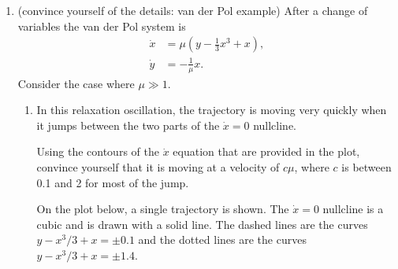 \documentclass[12pt]{amsart}
\theoremstyle{plain}
\theoremstyle{definition}
\theoremstyle{definition}
\theoremstyle{plain}
\begin{document}
    \begin{enumerate}
        \item (convince yourself of the details: van der Pol example) After a change of variables the van der Pol system is
        \[\begin{aligned}\dot x&=\mu\left(y-\frac13x^3+x\right),\\\dot y&=-\frac1\mu x.\end{aligned}\]
        Consider the case where $\mu\gg1$.
        \begin{enumerate}
            \item In this relaxation oscillation, the trajectory is moving very quickly when it jumps between the two parts of the $\dot x=0$ nullcline.

            Using the contours of the $\dot x$ equation that are provided in the plot, convince yourself that it is moving at a velocity of $c\mu$, where $c$ is between 0.1 and 2 for most of the jump.

            On the plot below, a single trajectory is shown. The $\dot x=0$ nullcline is a cubic and is drawn with a solid line. The dashed lines are the curves $y-x^3/3+x=\pm0.1$ and the dotted lines are the curves $y-x^3/3+x=\pm1.4$.
        \end{enumerate}
    \end{enumerate}
\end{document}

